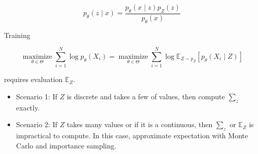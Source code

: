 \documentclass{report}
\begin{document}
\begin{definition}
    $$
    p_{\theta}(z \mid x)=\frac{p_{\theta}(x \mid z) p_{Z}(z)}{p_{\theta}(x)}
    $$

    \par\noindent\textcolor{gray}{\hdashrule{\textwidth}{0.4pt}{1pt 2pt}}

    Training

    $$
    \underset{\theta \in \Theta}{\operatorname{maximize}} \sum_{i=1}^{N} \log p_{\theta}\left(X_{i}\right)=\underset{\theta \in \Theta}{\operatorname{maximize}} \sum_{i=1}^{N} \log \mathbb{E}_{Z \sim p_{Z}}\left[p_{\theta}\left(X_{i} \mid Z\right)\right]
    $$

    requires evaluation $\mathbb{E}_{Z}$.

    \begin{itemize}
        \item Scenario 1: If $Z$ is discrete and takes a few of values, then compute $\sum_{z}$ exactly.
        \item Scenario 2: If $Z$ takes many values or if it is a continuous, then $\sum_{z}$ or $\mathbb{E}_{Z}$ is impractical to compute. In this case, approximate expectation with Monte Carlo and importance sampling.
    \end{itemize}
\end{definition}
\end{document}
